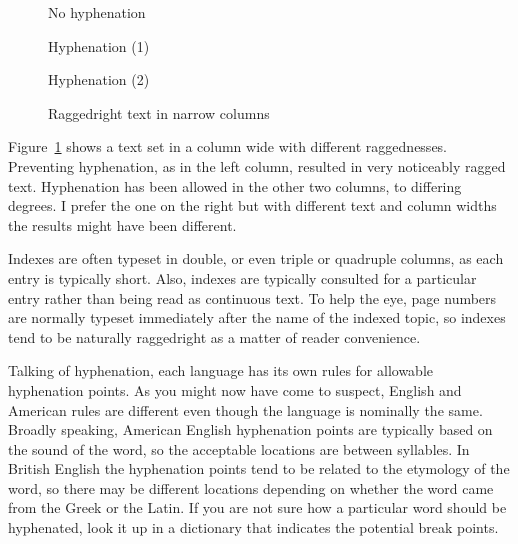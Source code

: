 \documentclass[10pt,letterpaper,extrafontsizes]{memoir}
\begin{document}
\begin{figure}
\centering
\begin{minipage}[t]{\rag}
\raggedright
\noindent No hyphenation
\vspace{\onelineskip}

\parindent=15pt\indent \ragtext
\end{minipage}
\hfill
\begin{minipage}[t]{\rag}
\raggedyright
\noindent Hyphenation (1)
\vspace{\onelineskip}

\indent \ragtext
\end{minipage}
\hfill
\begin{minipage}[t]{\rag}
\raggedyright[1em]
\noindent Hyphenation (2)
\vspace{\onelineskip}

\indent \ragtext
\end{minipage}
\caption{Raggedright text in narrow columns} \label{fig:raggedright}
\end{figure}

    Figure~\ref{fig:raggedright} shows a text set in a column
\the\rag{} wide with 
different raggednesses. Preventing hyphenation, as in the left column, 
resulted in very noticeably ragged text. Hyphenation has been allowed
in the other two columns, to differing degrees. I prefer
the one on the right but with different text and column widths the results
might have been different.

    Indexes are often typeset in double, 
or even triple or quadruple columns,
as each entry is typically short. Also, indexes are typically 
consulted
for a particular entry rather than being read as continuous text. To help
the eye, page numbers are normally typeset immediately after the 
name of the indexed topic, so indexes tend to be 
naturally raggedright as a matter of reader 
convenience.



    Talking of hyphenation,
 each language has its own rules for allowable
hyphenation points. As you might now have come to suspect, English and 
American rules are different even though the language is nominally the same.
Broadly speaking, American English hyphenation points are typically based on
the sound of the word, so the acceptable locations are between syllables.
In British English the hyphenation points tend to be related to the
etymology of the word, so there may be different locations depending on 
whether the word came from the Greek or the Latin. If you are not sure
how a particular word should be hyphenated, look it up in a dictionary
that indicates the potential break points.
\end{document}

